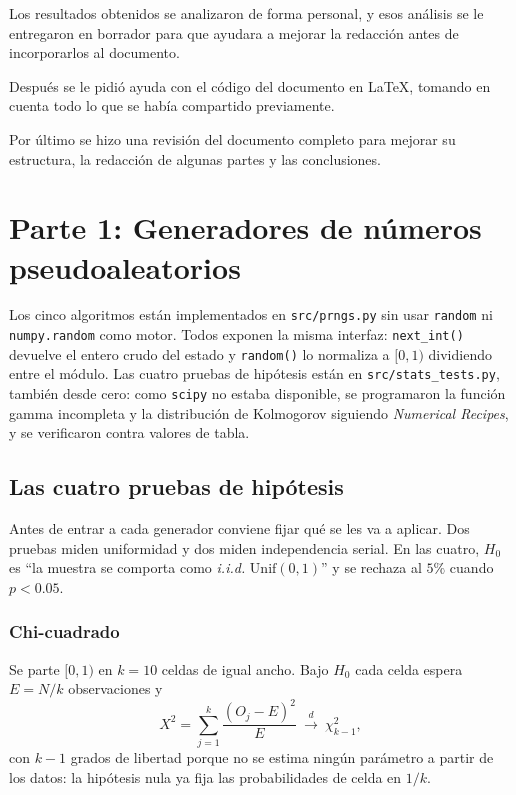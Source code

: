 \documentclass[11pt,letterpaper]{article}
\newcommand{\code}[1]{\texttt{#1}}
\begin{document}
Los resultados obtenidos se analizaron de forma personal, y esos análisis se
le entregaron en borrador para que ayudara a mejorar la redacción antes de
incorporarlos al documento.

Después se le pidió ayuda con el código del documento en \LaTeX, tomando en
cuenta todo lo que se había compartido previamente.

Por último se hizo una revisión del documento completo para mejorar su
estructura, la redacción de algunas partes y las conclusiones.

\newpage
\section{Parte 1: Generadores de números pseudoaleatorios}

Los cinco algoritmos están implementados en \code{src/prngs.py} sin usar
\code{random} ni \code{numpy.random} como motor. Todos exponen la misma
interfaz: \code{next\_int()} devuelve el entero crudo del estado y
\code{random()} lo normaliza a $[0,1)$ dividiendo entre el módulo. Las cuatro
pruebas de hipótesis están en \code{src/stats\_tests.py}, también desde cero:
como \code{scipy} no estaba disponible, se programaron la función gamma
incompleta y la distribución de Kolmogorov siguiendo \emph{Numerical
Recipes}, y se verificaron contra valores de tabla.

\subsection{Las cuatro pruebas de hipótesis}
\label{sec:pruebas}

Antes de entrar a cada generador conviene fijar qué se les va a aplicar. Dos
pruebas miden uniformidad y dos miden independencia serial. En las cuatro,
$H_0$ es ``la muestra se comporta como \emph{i.i.d.} $\mathrm{Unif}(0,1)$'' y
se rechaza al $5\%$ cuando $p < 0.05$.

\subsubsection{Chi-cuadrado} Se parte $[0,1)$ en $k=10$ celdas de igual ancho.
Bajo $H_0$ cada celda espera $E = N/k$ observaciones y
\begin{equation}
X^2 = \sum_{j=1}^{k} \frac{(O_j - E)^2}{E}
\ \xrightarrow{\ d\ }\ \chi^2_{k-1},
\end{equation}
con $k-1$ grados de libertad porque no se estima ningún parámetro a partir de
los datos: la hipótesis nula ya fija las probabilidades de celda en $1/k$.
\end{document}
